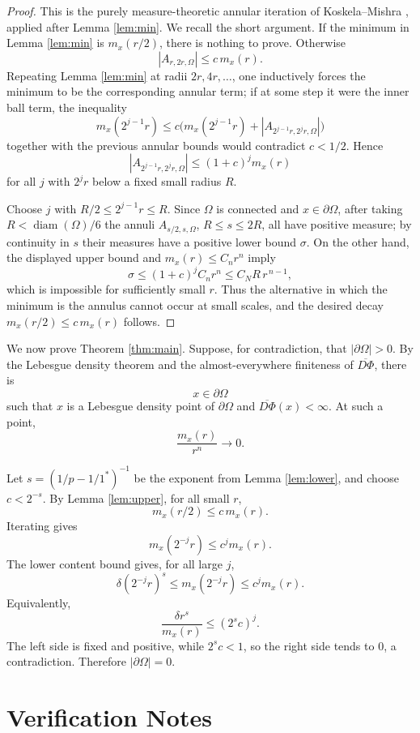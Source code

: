 \documentclass[11pt]{article}
\newcommand{\Om}{\Omega}
\newcommand{\onecrit}{1^\ast}
\newcommand{\diam}{\operatorname{diam}}
\begin{document}
\begin{proof}
This is the purely measure-theoretic annular iteration of
Koskela--Mishra \cite[Lemma 3.3]{KM}, applied after Lemma \ref{lem:min}. We
recall the short argument. If the minimum in Lemma \ref{lem:min} is
\(m_x(r/2)\), there is nothing to prove. Otherwise
\[
  |A_{r,2r,\Om}|\le c\,m_x(r).
\]
Repeating Lemma \ref{lem:min} at radii \(2r,4r,\ldots\), one inductively
forces the minimum to be the corresponding annular term; if at some step it
were the inner ball term, the inequality
\[
  m_x(2^{j-1}r)\le c\bigl(m_x(2^{j-1}r)+|A_{2^{j-1}r,2^jr,\Om}|\bigr)
\]
together with the previous annular bounds would contradict \(c<1/2\). Hence
\[
  |A_{2^{j-1}r,2^jr,\Om}|\le (1+c)^j m_x(r)
\]
for all \(j\) with \(2^jr\) below a fixed small radius \(R\).

Choose \(j\) with \(R/2\le 2^{j-1}r\le R\). Since \(\Om\) is connected and
\(x\in\partial\Om\), after taking \(R<\diam(\Om)/6\) the annuli
\(A_{s/2,s,\Om}\), \(R\le s\le2R\), all have positive measure; by continuity
in \(s\) their measures have a positive lower bound \(\sigma\). On the other
hand, the displayed upper bound and \(m_x(r)\le C_nr^n\) imply
\[
  \sigma\le (1+c)^j C_nr^n\le C_NR\,r^{\,n-1},
\]
which is impossible for sufficiently small \(r\). Thus the alternative in
which the minimum is the annulus cannot occur at small scales, and the desired
decay \(m_x(r/2)\le c\,m_x(r)\) follows.
\end{proof}

We now prove Theorem \ref{thm:main}. Suppose, for contradiction, that
\(|\partial\Om|>0\). By the Lebesgue density theorem and the almost-everywhere
finiteness of \(\overline{D\Phi}\), there is
\[
  x\in\partial\Om
\]
such that \(x\) is a Lebesgue density point of \(\partial\Om\) and
\(\overline{D\Phi}(x)<\infty\). At such a point,
\[
  \frac{m_x(r)}{r^n}\to0.
\]

Let \(s=(1/p-1/\onecrit)^{-1}\) be the exponent from Lemma \ref{lem:lower},
and choose \(c<2^{-s}\). By Lemma \ref{lem:upper}, for all small \(r\),
\[
  m_x(r/2)\le c\,m_x(r).
\]
Iterating gives
\[
  m_x(2^{-j}r)\le c^j m_x(r).
\]
The lower content bound gives, for all large \(j\),
\[
  \delta(2^{-j}r)^s\le m_x(2^{-j}r)\le c^j m_x(r).
\]
Equivalently,
\[
  \frac{\delta r^s}{m_x(r)}\le (2^s c)^j.
\]
The left side is fixed and positive, while \(2^s c<1\), so the right side
tends to \(0\), a contradiction. Therefore \(|\partial\Om|=0\).

\section*{Verification Notes}
\end{document}
